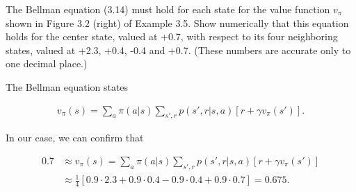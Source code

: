 
\begin{exercise}[Exercise 3.14]

The Bellman equation (3.14) must hold for each state for the value function $v_\pi$
shown in Figure 3.2 (right) of Example 3.5. Show numerically that this equation
holds for the center state, valued at +0.7, with respect to its four neighboring states,
valued at +2.3, +0.4, -0.4 and +0.7. (These numbers are accurate only to one decimal place.)

\end{exercise}


\begin{solution}

The Bellman equation states

\begin{align*}
  v_\pi(s) = \sum_a \pi(a|s) \sum_{s',r} p(s',r|s,a)[r + \gamma v_\pi(s')].
\end{align*}

In our case, we can confirm that

\begin{align*}
  0.7 &\approx v_\pi(s) = \sum_a \pi(a|s) \sum_{s',r} p(s',r|s,a)[r + \gamma v_\pi(s')] \\
  &\approx \frac{1}{4}[0.9\cdot 2.3 + 0.9 \cdot 0.4 - 0.9 \cdot 0.4 + 0.9 \cdot 0.7]
  = 0.675.
\end{align*}

\end{solution}


